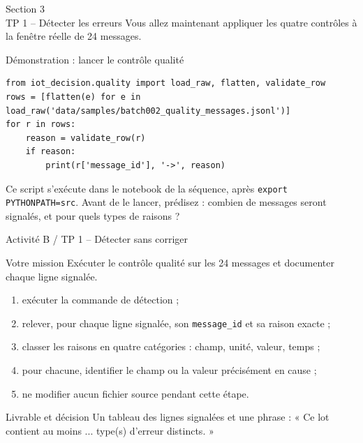 \documentclass[aspectratio=169]{beamer}
\begin{document}
\begin{frame}[plain]
  \centering
  \Huge Section 3\\[3mm]
  \Large TP 1 -- Détecter les erreurs
  \vfill
  \normalsize Vous allez maintenant appliquer les quatre contrôles à la fenêtre réelle de 24 messages.
\end{frame}

\begin{frame}[fragile]{Démonstration : lancer le contrôle qualité}
  \scriptsize
  \begin{verbatim}
from iot_decision.quality import load_raw, flatten, validate_row
rows = [flatten(e) for e in load_raw('data/samples/batch002_quality_messages.jsonl')]
for r in rows:
    reason = validate_row(r)
    if reason:
        print(r['message_id'], '->', reason)
  \end{verbatim}
  \normalsize
  Ce script s'exécute dans le notebook de la séquence, après \texttt{export PYTHONPATH=src}. Avant de le lancer, prédisez : combien de messages seront signalés, et pour quels types de raisons ?
\end{frame}

\begin{frame}{Activité B / TP 1 -- Détecter sans corriger}
  \begin{block}{Votre mission}
    Exécuter le contrôle qualité sur les 24 messages et documenter chaque ligne signalée.
  \end{block}
  \begin{enumerate}
    \item exécuter la commande de détection ;
    \item relever, pour chaque ligne signalée, son \texttt{message\_id} et sa raison exacte ;
    \item classer les raisons en quatre catégories : champ, unité, valeur, temps ;
    \item pour chacune, identifier le champ ou la valeur précisément en cause ;
    \item ne modifier aucun fichier source pendant cette étape.
  \end{enumerate}
  \begin{block}{Livrable et décision}
    Un tableau des lignes signalées et une phrase : « Ce lot contient au moins ... type(s) d'erreur distincts. »
  \end{block}
\end{frame}
\end{document}
